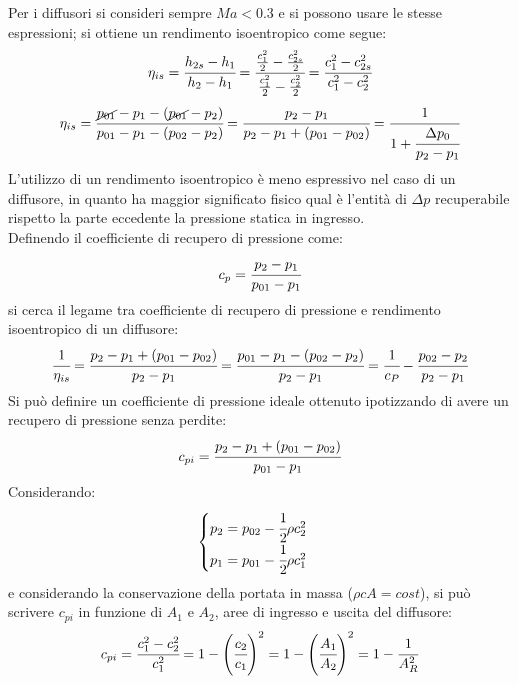 Per i diffusori si consideri sempre $Ma<0.3$ e si possono usare le stesse espressioni; si ottiene un rendimento isoentropico come segue:
\begin{align*}
\eta_{is} = \cfrac{h_{2s}-h_1}{h_2-h_1} =\cfrac{\frac{c_1^2}{2}-\frac{c_{2s}^2}{2}}{\frac{c_1^2}{2}-\frac{c_2^2}{2}}= \cfrac{c_1^2 - c_{2s}^2}{c_1^2 - c_2^2}
\end{align*}
\begin{align*}
\eta_{is} = \cfrac{\cancel{p_{01}} - p_1 - (\cancel{p_{01}} - p_2)}{p_{01} - p_1-(p_{02} - p_2)} = \cfrac{p_2 - p_1}{p_2 - p_1 + (p_{01} - p_{02})} = \cfrac{1}{1+ \cfrac{\Delta p_0}{p_2 - p_1}}
\end{align*}
L'utilizzo di un rendimento isoentropico è meno espressivo nel caso di un diffusore, in quanto ha maggior significato fisico qual è l'entità di $ \Delta p$ recuperabile rispetto la parte eccedente la pressione statica in ingresso.\\
Definendo il coefficiente di recupero di pressione come:
\begin{align*}
c_p = \cfrac{p_2 - p_1}{p_{01} - p_1}
\end{align*}
si cerca il legame tra coefficiente di recupero di pressione e rendimento isoentropico di un diffusore:
\begin{align*}
\cfrac{1}{\eta_{is}} = \cfrac{p_2 - p_1 + (p_{01} - p_{02})}{p_2 - p_1} = \cfrac{p_{01} - p_1 - (p_{02} - p_2)}{p_2-p_1} = \cfrac{1}{c_P} - \cfrac{p_{02} - p_2}{p_2 - p_1}
\end{align*}
Si può definire un coefficiente di pressione ideale ottenuto ipotizzando di avere un recupero di pressione senza perdite:
\begin{align*}
c_{pi} = \cfrac{p_2 - p_1 + (p_{01} - p_{02})}{p_{01} - p_1}
\end{align*}
Considerando:
\begin{align*}
\begin{cases}
p_{2} = p_{02} - \cfrac{1}{2} \rho c_2^2\\
p_{1} = p_{01} - \cfrac{1}{2} \rho c_1^2
\end{cases}
\end{align*}
e considerando la conservazione della portata in massa ($\rho c A=cost$), si può scrivere $c_{pi}$ in funzione di $A_1$ e $A_2$, aree di ingresso e uscita del diffusore:
\begin{align*}
c_{pi} = \cfrac{c_1^2 - c_2^2}{c_1^2} = 1 - \left( \cfrac{c_2}{c_1}\right)^2 = 1- \left(\cfrac{A_1}{A_2} \right)^2 =1-\cfrac{1}{A_R^2}
\end{align*}
